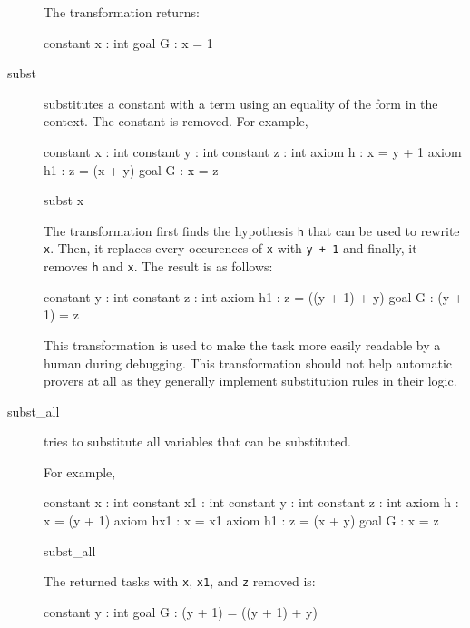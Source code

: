 \begin{description}
The transformation returns:

\begin{whycode}
constant x : int
goal G : x = 1
\end{whycode}



\item[subst] substitutes a constant  with a term  using an
  equality of the form  in the context. The constant is removed.
  For example,
\begin{whycode}
constant x : int
constant y : int
constant z : int
axiom h : x = y + 1
axiom h1 : z = (x + y)
goal G : x = z
\end{whycode}

\begin{transwhy3}
subst x
\end{transwhy3}

The transformation first finds the hypothesis \texttt{h} that can be used to
rewrite \texttt{x}. Then, it replaces every occurences of \texttt{x} with
\texttt{y + 1} and finally, it removes \texttt{h} and \texttt{x}.
The result is as follows:

\begin{whycode}
constant y : int
constant z : int
axiom h1 : z = ((y + 1) + y)
goal G : (y + 1) = z
\end{whycode}

This transformation is used to make the task more easily readable by a human
during debugging. This transformation should not help automatic provers at all
as they generally implement substitution rules in their logic.



\item[subst\_all] tries to substitute all variables that can be substituted.

  For example,
\begin{whycode}
constant x : int
constant x1 : int
constant y : int
constant z : int
axiom h : x = (y + 1)
axiom hx1 : x = x1
axiom h1 : z = (x + y)
goal G : x = z
\end{whycode}

\begin{transwhy3}
subst_all
\end{transwhy3}

The returned tasks with \texttt{x}, \texttt{x1}, and \texttt{z} removed is:
\begin{whycode}
constant y : int
goal G : (y + 1) = ((y + 1) + y)
\end{whycode}


\end{description}
